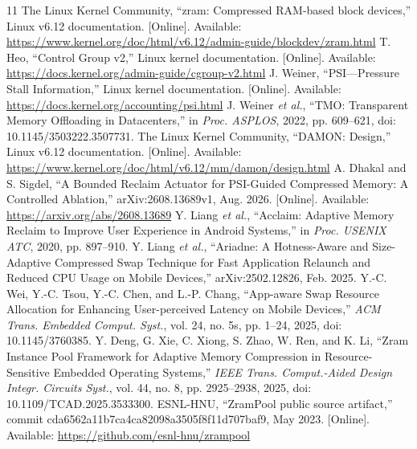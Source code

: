 \documentclass[conference]{IEEEtran}
\begin{document}
\begin{thebibliography}{11}
 The Linux Kernel Community, ``zram: Compressed RAM-based block devices,'' Linux v6.12 documentation. [Online]. Available: \url{https://www.kernel.org/doc/html/v6.12/admin-guide/blockdev/zram.html}
 T. Heo, ``Control Group v2,'' Linux kernel documentation. [Online]. Available: \url{https://docs.kernel.org/admin-guide/cgroup-v2.html}
 J. Weiner, ``PSI---Pressure Stall Information,'' Linux kernel documentation. [Online]. Available: \url{https://docs.kernel.org/accounting/psi.html}
 J. Weiner \emph{et al.}, ``TMO: Transparent Memory Offloading in Datacenters,'' in \emph{Proc. ASPLOS}, 2022, pp. 609--621, doi: 10.1145/3503222.3507731.
 The Linux Kernel Community, ``DAMON: Design,'' Linux v6.12 documentation. [Online]. Available: \url{https://www.kernel.org/doc/html/v6.12/mm/damon/design.html}
 A. Dhakal and S. Sigdel, ``A Bounded Reclaim Actuator for PSI-Guided Compressed Memory: A Controlled Ablation,'' arXiv:2608.13689v1, Aug. 2026. [Online]. Available: \url{https://arxiv.org/abs/2608.13689}
 Y. Liang \emph{et al.}, ``Acclaim: Adaptive Memory Reclaim to Improve User Experience in Android Systems,'' in \emph{Proc. USENIX ATC}, 2020, pp. 897--910.
 Y. Liang \emph{et al.}, ``Ariadne: A Hotness-Aware and Size-Adaptive Compressed Swap Technique for Fast Application Relaunch and Reduced CPU Usage on Mobile Devices,'' arXiv:2502.12826, Feb. 2025.
 Y.-C. Wei, Y.-C. Tsou, Y.-C. Chen, and L.-P. Chang, ``App-aware Swap Resource Allocation for Enhancing User-perceived Latency on Mobile Devices,'' \emph{ACM Trans. Embedded Comput. Syst.}, vol. 24, no. 5s, pp. 1--24, 2025, doi: 10.1145/3760385.
 Y. Deng, G. Xie, C. Xiong, S. Zhao, W. Ren, and K. Li, ``Zram Instance Pool Framework for Adaptive Memory Compression in Resource-Sensitive Embedded Operating Systems,'' \emph{IEEE Trans. Comput.-Aided Design Integr. Circuits Syst.}, vol. 44, no. 8, pp. 2925--2938, 2025, doi: 10.1109/TCAD.2025.3533300.
 ESNL-HNU, ``ZramPool public source artifact,'' commit cda6562a11b7ca4ca82098a3505f8f11d707baf9, May 2023. [Online]. Available: \url{https://github.com/esnl-hnu/zrampool}
\end{thebibliography}
\end{document}
